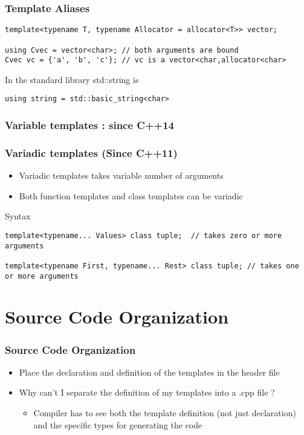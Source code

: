 \documentclass{beamer}
\begin{document}
\begin{frame}[fragile]
\frametitle{Template Aliases}

\begin{lstlisting}
template<typename T, typename Allocator = allocator<T>> vector;

using Cvec = vector<char>; // both arguments are bound
Cvec vc = {'a', 'b', 'c'}; // vc is a vector<char,allocator<char>
\end{lstlisting}

\begin{block} {In the standard library std::string is}
\begin{lstlisting}
using string = std::basic_string<char>
\end{lstlisting}
\end{block}

\end{frame}

\begin{frame}
\frametitle{Variable templates : since C++14}

\end{frame}


\begin{frame}[fragile]
\frametitle{Variadic templates (Since C++11)}
\begin{itemize}
\item Variadic templates takes variable number of arguments
\item Both function templates and class templates can be variadic
\end{itemize}
\begin{block} {Syntax}
\begin{lstlisting}
template<typename... Values> class tuple;  // takes zero or more arguments

template<typename First, typename... Rest> class tuple; // takes one or more arguments
\end{lstlisting}
\end{block}

\end{frame}

\section{Source Code Organization}
\begin{frame}[fragile]
\frametitle{Source Code Organization}

\begin{itemize}
\item Place the declaration and definition of the templates in the header file
\item Why can’t I separate the definition of my templates into a .cpp file ?
    \begin{itemize}
    \item Compiler has to see both the template definition (not just declaration) and the specific types for generating the code
    \end{itemize}
\end{itemize}

\end{frame}
\end{document}
